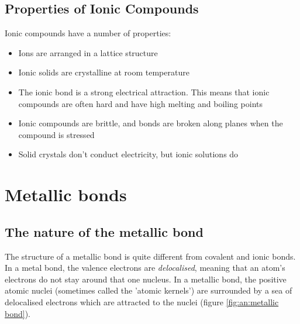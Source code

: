 \subsection{Properties of Ionic Compounds}
\label{subsec:bonding:ionic properties}

Ionic compounds have a number of properties:

\begin{itemize}
\item{Ions are arranged in a lattice structure}
\item{Ionic solids are crystalline at room temperature}
\item{The ionic bond is a strong electrical attraction. This means that ionic compounds are often hard and have high melting and boiling points}
\item{Ionic compounds are brittle, and bonds are broken along planes when the compound is stressed}
\item{Solid crystals don't conduct electricity, but ionic solutions do}
\end{itemize}







\section{Metallic bonds}

\subsection{The nature of the metallic bond}

The structure of a metallic bond is quite different from covalent and ionic bonds. In a metal bond, the valence electrons are \textit{delocalised}, meaning that an atom's electrons do not stay around that one nucleus. In a metallic bond, the positive atomic nuclei (sometimes called the 'atomic kernels') are surrounded by a sea of delocalised electrons which are attracted to the nuclei (figure \ref{fig:an:metallic bond}). 


